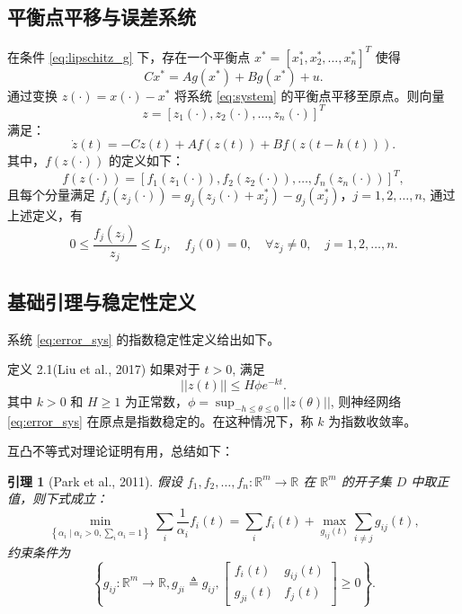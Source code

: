 \documentclass[a4paper, 12pt, oneside]{article}
\theoremstyle{cn_theorem}
\newtheorem{lemma}{引理}[section]   %
\begin{document}
\subsection{平衡点平移与误差系统}
在条件 \eqref{eq:lipschitz_g} 下，存在一个平衡点 $x^* = [x_1^*, x_2^*, \dots, x_n^*]^T$ 使得
\begin{equation}
    C x^* = A g(x^*) + B g(x^*) + u.
\end{equation}
通过变换 $z(\cdot) = x(\cdot) - x^*$ 将系统 \eqref{eq:system} 的平衡点平移至原点。则向量
\begin{equation*}
    z = [z_1(\cdot), z_2(\cdot), \dots, z_n(\cdot)]^T
\end{equation*}
满足：
\begin{equation} \label{eq:error_sys}
    \dot{z}(t) = -C z(t) + A f(z(t)) + B f(z(t-h(t))).
\end{equation}
其中，$f(z(\cdot))$ 的定义如下：
\begin{equation*}
    f(z(\cdot)) = [f_1(z_1(\cdot)), f_2(z_2(\cdot)), \dots, f_n(z_n(\cdot))]^T,
\end{equation*}
且每个分量满足 $f_j(z_j(\cdot)) = g_j(z_j(\cdot) + x_j^*) - g_j(x_j^*)$，$j=1,2,\dots,n$, 通过上述定义，有
\begin{equation} \label{eq:lipschitz_f}
    0 \le \frac{f_j(z_j)}{z_j} \le L_j, \quad f_j(0)=0, \quad \forall z_j \neq 0, \quad j=1,2,\dots,n.
\end{equation}

\subsection{基础引理与稳定性定义}
系统 \eqref{eq:error_sys} 的指数稳定性定义给出如下。

定义 2.1(Liu et al., 2017) 如果对于 $t > 0$, 满足
\begin{equation*}
    ||z(t)|| \le H \phi e^{-kt}.
\end{equation*}
其中 $k > 0$ 和 $H \ge 1$ 为正常数，$\phi = \sup_{-h \le \theta \le 0} ||z(\theta)||$, 则神经网络 \eqref{eq:error_sys} 在原点是指数稳定的。在这种情况下，称 $k$ 为指数收敛率。

互凸不等式对理论证明有用，总结如下：

\begin{lemma}[Park et al., 2011] \label{lemma:Park2011}
假设 $f_1, f_2, \dots, f_n: \mathbb{R}^m \to \mathbb{R}$ 在 $\mathbb{R}^m$ 的开子集 $D$ 中取正值，则下式成立：
\begin{equation}
    \min_{\left\{\alpha_i \mid \alpha_i > 0, \sum_i \alpha_i = 1\right\}} \sum_i \frac{1}{\alpha_i} f_i(t) = \sum_i f_i(t) + \max_{g_{ij}(t)} \sum_{i \neq j} g_{ij}(t),
\end{equation}
约束条件为
\begin{equation*}
    \left\{ g_{ij}: \mathbb{R}^m \to \mathbb{R}, g_{ji} \triangleq g_{ij}, \begin{bmatrix} f_i(t) & g_{ij}(t) \\ g_{ji}(t) & f_j(t) \end{bmatrix} \ge 0 \right\}.
\end{equation*}
\end{lemma}
\end{document}
